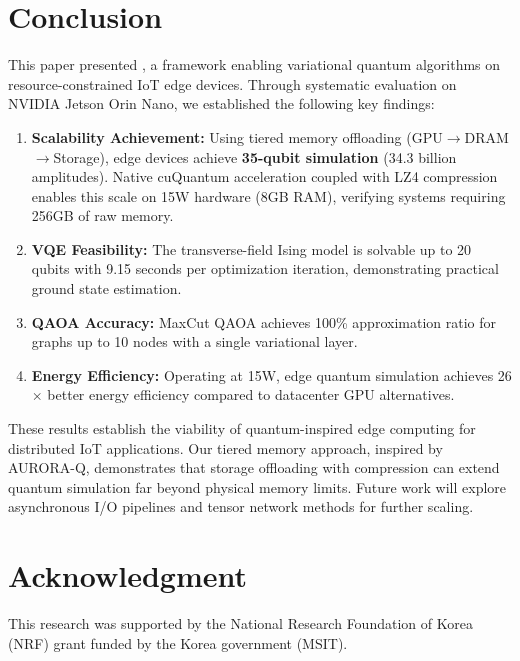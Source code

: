 \section{Conclusion}
\label{sec:conclusion}

This paper presented \EdgeQuantum, a framework enabling variational quantum algorithms on resource-constrained IoT edge devices. Through systematic evaluation on NVIDIA Jetson Orin Nano, we established the following key findings:

\begin{enumerate}
    \item \textbf{Scalability Achievement:} Using tiered memory offloading (GPU$\rightarrow$DRAM$\rightarrow$Storage), edge devices achieve \textbf{35-qubit simulation} (34.3 billion amplitudes). Native cuQuantum acceleration coupled with LZ4 compression enables this scale on 15W hardware (8GB RAM), verifying systems requiring 256GB of raw memory.
    
    \item \textbf{VQE Feasibility:} The transverse-field Ising model is solvable up to 20 qubits with 9.15 seconds per optimization iteration, demonstrating practical ground state estimation.
    
    \item \textbf{QAOA Accuracy:} MaxCut QAOA achieves 100\% approximation ratio for graphs up to 10 nodes with a single variational layer.
    
    \item \textbf{Energy Efficiency:} Operating at 15W, edge quantum simulation achieves 26$\times$ better energy efficiency compared to datacenter GPU alternatives.
\end{enumerate}

These results establish the viability of quantum-inspired edge computing for distributed IoT applications. Our tiered memory approach, inspired by AURORA-Q, demonstrates that storage offloading with compression can extend quantum simulation far beyond physical memory limits. Future work will explore asynchronous I/O pipelines and tensor network methods for further scaling.

\section*{Acknowledgment}

This research was supported by the National Research Foundation of Korea (NRF) grant funded by the Korea government (MSIT).
